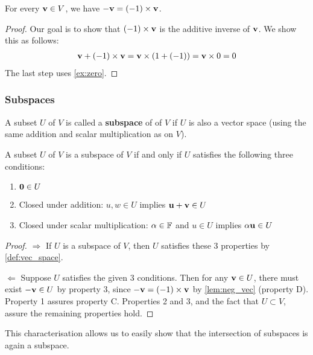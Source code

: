 \documentclass{article}
\begin{document}
\begin{lemma}
\label{lem:neg_vec}
For every ${\mathbf{v}} \in V$, we have $-{\mathbf{v}} = (-1) \times {\mathbf{v}}$.
\end{lemma}
\begin{proof}
Our goal is to show that $(-1) \times {\mathbf{v}}$ is the additive inverse of ${\mathbf{v}}$.
We show this as follows:
\begin{align*}
    {\mathbf{v}} + (-1) \times {\mathbf{v}} = {\mathbf{v}} \times (1 + (-1)) = {\mathbf{v}} \times 0 = 0
\end{align*}
The last step uses \cref{ex:zero}.
\end{proof}

\subsubsection{Subspaces}

\begin{definition}
A subset $U$ of $V$ is called a \textbf{subspace} of of $V$ if $U$ is also a vector space (using the same addition and scalar multiplication as on $V$).
\end{definition}


\begin{proposition}\label{prop: characterization of subspace}
A subset $U$ of $V$ is a subspace of $V$ if
and only if $U$ satisfies the following three conditions:
\begin{enumerate}
\item  ${\mathbf{0}} \in U$
\item Closed under addition: $u,w\in U$ implies ${\mathbf{u}}+{\mathbf{v}} \in U$
\item Closed under scalar multiplication: $\alpha \in{\mathbb{F}}$ and $u\in U$
implies $\alpha {\mathbf{u}} \in U$
\end{enumerate}
\end{proposition}

\begin{proof}
$\Rightarrow$ If $U$ is a subspace of $V$, then $U$ satisfies these 3 properties by \cref{def:vec_space}.

$\Leftarrow$ Suppose $U$ satisfies the given 3 conditions. Then for any ${\mathbf{v}} \in U$, there must exist $-{\mathbf{v}} \in U$ by property 3, since $-{\mathbf{v}} = (-1) \times {\mathbf{v}}$ by \cref{lem:neg_vec} (property D). Property 1 assures property C. Properties 2 and 3, and the fact that $U \subset V$, assure the remaining properties hold. 

\end{proof}

This characterisation allows us to easily show that the intersection of subspaces is again a subspace.
\end{document}
